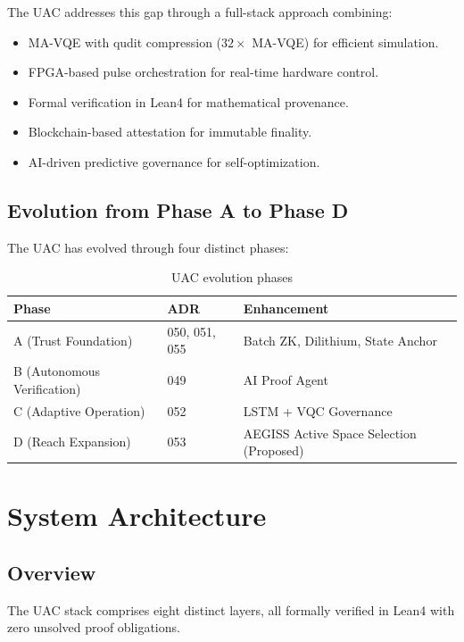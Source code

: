 \documentclass[11pt,a4paper]{article}
\begin{document}
The UAC addresses this gap through a full-stack approach combining:
\begin{itemize}
    \item MA-VQE with qudit compression ($32\times$ MA-VQE) for efficient simulation.
    \item FPGA-based pulse orchestration for real-time hardware control.
    \item Formal verification in Lean4 for mathematical provenance.
    \item Blockchain-based attestation for immutable finality.
    \item AI-driven predictive governance for self-optimization.
\end{itemize}

\subsection{Evolution from Phase A to Phase D}
The UAC has evolved through four distinct phases:

\begin{table}[h]
\centering
\begin{tabular}{lll}
\toprule
\textbf{Phase} & \textbf{ADR} & \textbf{Enhancement} \\
\midrule
A (Trust Foundation) & 050, 051, 055 & Batch ZK, Dilithium, State Anchor \\
B (Autonomous Verification) & 049 & AI Proof Agent \\
C (Adaptive Operation) & 052 & LSTM + VQC Governance \\
D (Reach Expansion) & 053 & AEGISS Active Space Selection (Proposed) \\
\bottomrule
\end{tabular}
\caption{UAC evolution phases}
\label{tab:phases}
\end{table}

\section{System Architecture}

\subsection{Overview}
The UAC stack comprises eight distinct layers, all formally verified in Lean4 with zero unsolved proof obligations.
\end{document}
